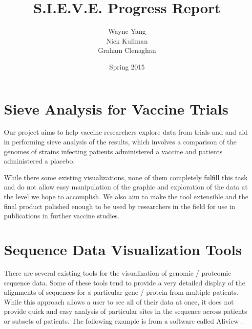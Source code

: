 \documentclass{article}
\begin{document}
\title{S.I.E.V.E. Progress Report}
\author{Wayne Yang \\ Nick Kullman \\ Graham Clenaghan}
\date{Spring 2015}
\maketitle

\section{Sieve Analysis for Vaccine Trials}

Our project aims to help vaccine researchers explore data from trials and and aid in performing sieve analysis of the results, which involves a comparison of the genomes of strains infecting patients administered a vaccine and patients administered a placebo.

While there some existing visualizations, none of them completely fulfill this task and do not allow easy manipulation of the graphic and exploration of the data at the level we hope to accomplish. We also aim to make the tool extensible and the final product polished enough to be used by researchers in the field for use in publications in further vaccine studies.

\section{Sequence Data Visualization Tools}

There are several existing tools for the visualization of genomic / proteomic sequence data.  Some of these tools tend to provide a very detailed display of the alignments of sequences for a particular gene / protein from multiple patients.  While this approach allows a user to see all of their data at once, it does not provide quick and easy analysis of particular sites in the sequence across patients or subsets of patients.  The following example is from a software called Aliview \cite{aliview}.
\end{document}
